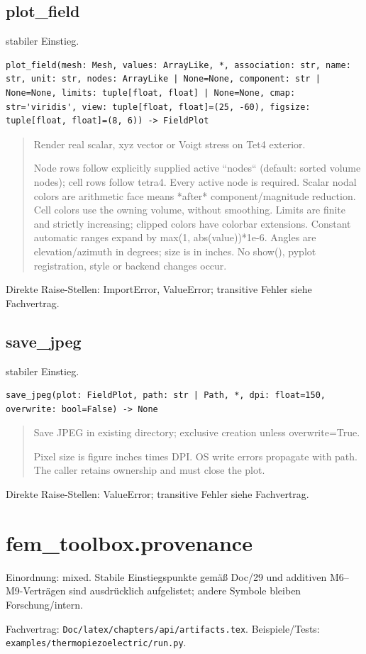 \subsection{plot\_field}
stabiler Einstieg.
\begin{lstlisting}
plot_field(mesh: Mesh, values: ArrayLike, *, association: str, name: str, unit: str, nodes: ArrayLike | None=None, component: str | None=None, limits: tuple[float, float] | None=None, cmap: str='viridis', view: tuple[float, float]=(25, -60), figsize: tuple[float, float]=(8, 6)) -> FieldPlot
\end{lstlisting}
\begin{quote}
Render real scalar, xyz vector or Voigt stress on Tet4 exterior.\par Node rows follow explicitly supplied active ``nodes`` (default: sorted volume nodes); cell rows follow tetra4. Every active node is required. Scalar nodal colors are arithmetic face means *after* component/magnitude reduction. Cell colors use the owning volume, without smoothing. Limits are finite and strictly increasing; clipped colors have colorbar extensions. Constant automatic ranges expand by max(1, abs(value))*1e-6. Angles are elevation/azimuth in degrees; size is in inches. No show(), pyplot registration, style or backend changes occur.
\end{quote}
Direkte Raise-Stellen: ImportError, ValueError; transitive Fehler siehe Fachvertrag.
\subsection{save\_jpeg}
stabiler Einstieg.
\begin{lstlisting}
save_jpeg(plot: FieldPlot, path: str | Path, *, dpi: float=150, overwrite: bool=False) -> None
\end{lstlisting}
\begin{quote}
Save JPEG in existing directory; exclusive creation unless overwrite=True.\par Pixel size is figure inches times DPI. OS write errors propagate with path. The caller retains ownership and must close the plot.
\end{quote}
Direkte Raise-Stellen: ValueError; transitive Fehler siehe Fachvertrag.
\section{fem\_toolbox.provenance}
Einordnung: mixed. Stabile Einstiegspunkte gemäß Doc/29 und additiven M6–M9-Verträgen sind ausdrücklich aufgelistet; andere Symbole bleiben Forschung/intern.
\par Fachvertrag: \nolinkurl{Doc/latex/chapters/api/artifacts.tex}. Beispiele/Tests:
\nolinkurl{examples/thermopiezoelectric/run.py}.
